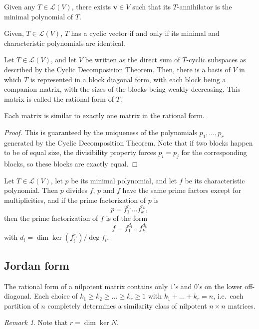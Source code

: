 \documentclass[11pt]{article}
\renewcommand{\vec}[1]{\boldsymbol{#1}}
\newcommand{\vv}{\vec{v}}
\newcommand{\alg}[1]{\mathscr{#1}}
\newcommand{\algL}{\alg{L}}
\renewcommand{\ker}{\operatorname{ker}}
\theoremstyle{definition}
\theoremstyle{remark}
\newtheorem*{remark}{Remark}
\numberwithin{equation}{section}
\begin{document}
    \begin{corollary}
        Given any $T \in \algL(V)$, there exists $\vv \in V$ such that its
        $T$-annihilator is the minimal polynomial of $T$.
    \end{corollary}

    \begin{corollary}
        Given, $T \in \algL(V)$, $T$ has a cyclic vector if and only if its minimal
        and characteristic polynomials are identical.
    \end{corollary}

    \begin{definition}
        Let $T \in \algL(V)$, and let $V$ be written as the direct sum of $T$-cyclic
        subspaces as described by the Cyclic Decomposition Theorem. Then, there is a
        basis of $V$ in which $T$ is represented in a block diagonal form, with each
        block being a companion matrix, with the sizes of the blocks being weakly
        decreasing. This matrix is called the rational form of $T$.
    \end{definition}

    \begin{theorem}
        Each matrix is similar to exactly one matrix in the rational form.
    \end{theorem}
    \begin{proof}
        This is guaranteed by the uniqueness of the polynomials $p_1, \dots, p_r$
        generated by the Cyclic Decomposition Theorem. Note that if two blocks happen
        to be of equal size, the divisibility property forces $p_i = p_j$ for the
        corresponding blocks, so these blocks are exactly equal.
    \end{proof}

    \begin{theorem}
        Let $T \in \algL(V)$, let $p$ be its minimal polynomial, and let $f$ be its
        characteristic polynomial. Then $p$ divides $f$, $p$ and $f$ have the same
        prime factors except for multiplicities, and if the prime factorization of
        $p$ is \[
            p = f_1^{r_1}\dots f_k^{r_k},
        \] then the prime factorization of $f$ is of the form \[
            f = f_1^{d_1}\dots f_k^{d_k}
        \] with $d_i = \dim{\ker{(f_i^{r_i})}} / \deg{f_i}$.
    \end{theorem}

    \subsection{Jordan form}
    \begin{lemma}
        The rational form of a nilpotent matrix contains only $1$'s and $0$'s on the
        lower off-diagonal. Each choice of $k_1\geq k_2\geq \dots\geq k_r \geq 1$
        with $k_1 + \dots + k_r = n$, i.e.\ each partition of $n$ completely
        determines a similarity class of nilpotent $n \times n$ matrices.

        \begin{remark}
            Note that $r = \dim{\ker{N}}$.
        \end{remark}
    \end{lemma}
\end{document}
